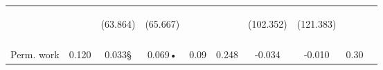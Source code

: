 \begin{tabular}{lccccccccc}
 & \begin{footnotesize}\end{footnotesize} & \begin{footnotesize}(63.864)\end{footnotesize} & \begin{footnotesize}(65.667)\end{footnotesize} & \begin{footnotesize}\end{footnotesize} & \begin{footnotesize}\end{footnotesize} & \begin{footnotesize}(102.352)\end{footnotesize} & \begin{footnotesize}(121.383)\end{footnotesize} & \begin{footnotesize}\end{footnotesize} & \begin{footnotesize}\end{footnotesize}\\
 & \begin{footnotesize}\end{footnotesize} & \begin{footnotesize}[0.437]\end{footnotesize} & \begin{footnotesize}[1.000]\end{footnotesize} & \begin{footnotesize}\end{footnotesize} & \begin{footnotesize}\end{footnotesize} & \begin{footnotesize}[0.753]\end{footnotesize} & \begin{footnotesize}[0.096]\end{footnotesize} & \begin{footnotesize}\end{footnotesize} & \begin{footnotesize}\end{footnotesize}\\
\noalign{\smallskip}Perm. work & 0.120 & 0.033§ & 0.069• & 0.09 & 0.248 & -0.034 & -0.010 & 0.30 & \\

\end{tabular}
